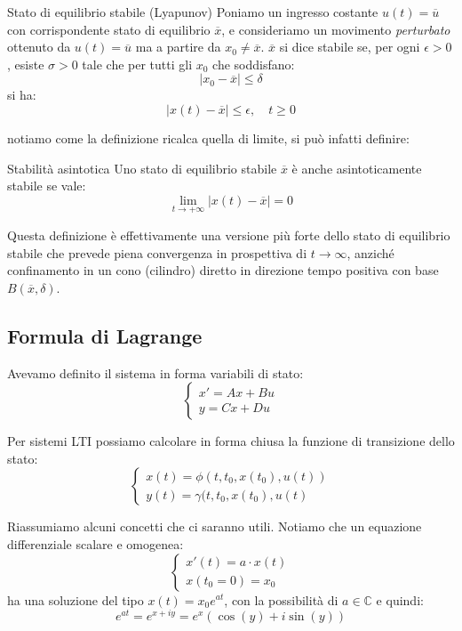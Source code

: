 \documentclass[a4paper,11pt]{article}
\begin{document}
\begin{definition}{Stato di equilibrio stabile (Lyapunov)}
	Poniamo un ingresso costante $u(t) = \overline{u}$ con corrispondente stato di equilibrio $\overline{x}$, e consideriamo un movimento \textit{perturbato} ottenuto da $u(t) = \overline{u}$ ma a partire da $x_0 \neq \overline{x}$.
	$\overline{x}$ si dice stabile se, per ogni $\epsilon > 0$, esiste $\sigma > 0$ tale che per tutti gli $x_0$ che soddisfano:
	$$
		|x_0 - \overline{x}| \leq \delta 
	$$
	si ha:
	$$
		|x(t) - \overline{x} | \leq \epsilon, \quad t \geq 0 
	$$
\end{definition}
notiamo come la definizione ricalca quella di limite, si può infatti definire:
\begin{definition}{Stabilità asintotica}
	Uno stato di equilibrio stabile $\overline{x}$ è anche asintoticamente stabile se vale:
	$$
		\lim_{t\rightarrow+\infty} |x(t) - \overline{x}| = 0 
	$$
\end{definition}

Questa definizione è effettivamente una versione più forte dello stato di equilibrio stabile che prevede piena convergenza in prospettiva di $t \rightarrow \infty$, anziché confinamento in un cono (cilindro) diretto in direzione tempo positiva con base $B(\overline{x}, \delta)$.

\subsection{Formula di Lagrange}
Avevamo definito il sistema in forma variabili di stato:
\[
	\begin{cases}
		x' = Ax + Bu \\ 
		y = Cx + Du
	\end{cases}
\]

Per sistemi LTI possiamo calcolare in forma chiusa la funzione di transizione dello stato:
\[
	\begin{cases}			
		x(t) = \phi(t, t_0, x(t_0), u(t)) \\ 
		y(t) = \gamma(t, t_0, x(t_0), u(t)  
	\end{cases}
\]

Riassumiamo alcuni concetti che ci saranno utili.
Notiamo che un equazione differenziale scalare e omogenea:
\[
	\begin{cases}
		x'(t) = a \cdot x(t) \\ 
		x(t_0 = 0) = x_0
	\end{cases}
\]
ha una soluzione del tipo $x(t) = x_0 e^{at}$, con la possibilità di $a \in \mathbb{C}$ e quindi:
$$
e^{at} = e^{x + iy} = e^x \left( \cos(y) + i \sin(y) \right)
$$
\end{document}
